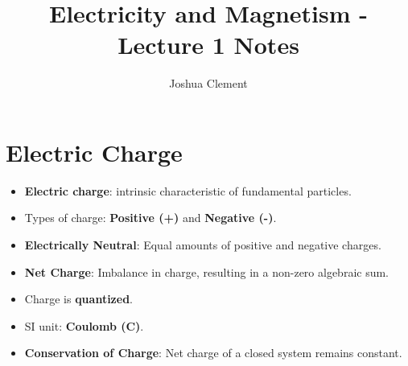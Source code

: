 \documentclass{article}
\begin{document}
\title{Electricity and Magnetism - Lecture 1 Notes}
\author{Joshua Clement}
\maketitle

\section*{Electric Charge}
\begin{itemize}
    \item \textbf{Electric charge}: intrinsic characteristic of fundamental particles.
    \item Types of charge: \textbf{Positive (+)} and \textbf{Negative (-)}.
    \item \textbf{Electrically Neutral}: Equal amounts of positive and negative charges.
    \item \textbf{Net Charge}: Imbalance in charge, resulting in a non-zero algebraic sum.
    \item Charge is \textbf{quantized}.
    \item SI unit: \textbf{Coulomb (C)}.
    \item \textbf{Conservation of Charge}: Net charge of a closed system remains constant.
\end{itemize}
\end{document}
